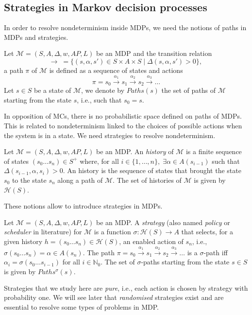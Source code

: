 \subsection{Strategies in Markov decision processes}
In order to resolve nondeterminism inside MDPs, we need the notions of paths in MDPs and strategies.
\begin{definition}
  Let $\mathcal{M}=(S, A, \Delta, w, AP, L)$ be an MDP and the transition relation
  \[\rightarrow \; =  \{ (s, \alpha, s') \in S \times A \times S \; | \; \Delta(s, \alpha, s') > 0 \}, \,\]
	a path $\pi$ of $\mathcal{M}$ is defined as a sequence of states and actions
	\[ \pi = s_0 \xrightarrow{\alpha_1} s_1 \xrightarrow{\alpha_2} s_2 \xrightarrow{\alpha_3} \dots \]
	Let $s \in S$ be a state of $\mathcal{M}$, we denote by $Paths(s)$ the set of
	paths of $\mathcal{M}$ starting from the state $s$, i.e., such that $s_0 = s$.
\end{definition}
In opposition of MCs, there is no probabilistic space defined on paths of MDPs.
This is related to nondeterminism linked to the choices of possible actions when the system is in a state. We need strategies to resolve nondeterminism.
\begin{definition}
	Let $\mathcal{M} = (S, A, \Delta, w, AP, L)$ be an MDP. An \textit{history} of $\mathcal{M}$
	is a finite sequence of states $(s_0 \dots s_n) \in S^+$ where, for all
	$i \in \{1, \dots, n \}, \; \exists \alpha \in A(s_{i-1})$ such that $\Delta(s_{i-1}, \alpha, s_i) > 0$.
	An history is the sequence of states that brought the state $s_0$ to the state $s_n$ along a path of $\mathcal{M}$. The set of histories of $\mathcal{M}$  is given by $\mathcal{H}(S)$.
\end{definition}

These notions allow to introduce strategies in MDPs.

\begin{definition}
Let $\mathcal{M} = (S, A, \Delta, w, AP, L)$ be an MDP. A \textit{strategy} (also named \textit{policy} or \textit{scheduler} in literature) for $\mathcal{M}$
	is a function
	$\sigma: \mathcal{H}(S) \rightarrow A$
	that selects, for a given history $h = (s_0 \dots s_n) \in \mathcal{H}(S)$, an enabled action of $s_n$, i.e., $\sigma(s_0 \dots s_n) = \alpha \in A(s_n)$.
	The path $\pi = s_0 \xrightarrow{\alpha_1} s_1 \xrightarrow{\alpha_2} s_2 \xrightarrow{\alpha_3} \dots$
	is a $\sigma$-path iff $\alpha_i = \sigma(s_0 \dots s_{i-1})$
	for all $i \in \mathbb{N}_0$. The set of $\sigma$-paths starting from the state $s \in S$ is given by $Paths^\sigma(s)$.
\end{definition}
Strategies that we study here are \textit{pure}, i.e., each action is chosen by strategy with probability one. We will see later that \textit{randomised} strategies exist and are essential to resolve some types of problems in MDP. \\


